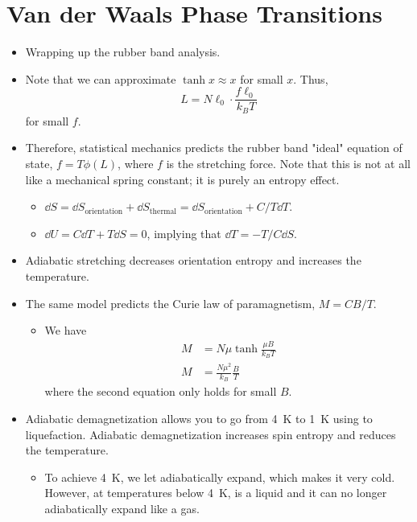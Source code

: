\documentclass[../notes.tex]{subfiles}
\begin{document}
\section{Van der Waals Phase Transitions}
\begin{itemize}
    \item {}Wrapping up the rubber band analysis.
    \item Note that we can approximate $\tanh x\approx x$ for small $x$. Thus,
    \begin{equation*}
        L = N\ell_0\cdot\frac{f\ell_0}{k_BT}
    \end{equation*}
    for small $f$.
    \item Therefore, statistical mechanics predicts the rubber band "ideal" equation of state, $f=T\phi(L)$, where $f$ is the stretching force. Note that this is not at all like a mechanical spring constant; it is purely an entropy effect.
    \begin{itemize}
        \item $\dd{S}=\dd{S_\text{orientation}}+\dd{S_\text{thermal}}=\dd{S_\text{orientation}}+C/T\dd{T}$.
        \item $\dd{U}=C\dd{T}+T\dd{S}=0$, implying that $\dd{T}=-T/C\dd{S}$.
    \end{itemize}
    \item Adiabatic stretching decreases orientation entropy and increases the temperature.
    \item The same model predicts the Curie law of paramagnetism, $M=CB/T$.
    \begin{itemize}
        \item We have
        \begin{align*}
            M &= N\mu\tanh\frac{\mu B}{k_BT}\\
            M &= \frac{N\mu^2}{k_B}\frac{B}{T}
        \end{align*}
        where the second equation only holds for small $B$.
    \end{itemize}
    \item Adiabatic demagnetization allows you to go from \SI{4}{\kelvin} to \SI{1}{\kelvin} using  to  liquefaction. Adiabatic demagnetization increases spin entropy and reduces the temperature.
    \begin{itemize}
        \item To achieve \SI{4}{\kelvin}, we let  adiabatically expand, which makes it very cold. However, at temperatures below \SI{4}{\kelvin},  is a liquid and it can no longer adiabatically expand like a gas.

\end{itemize}
\end{itemize}
\end{document}
